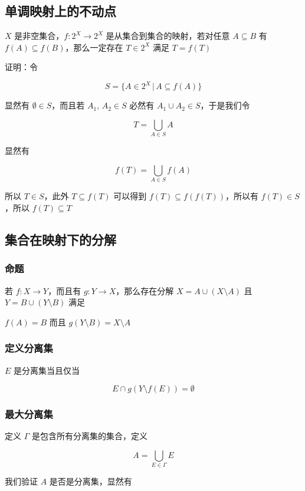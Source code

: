 \documentclass[12pt,a4paper]{ctexart}
\begin{document}
\subsection{单调映射上的不动点}

$X$ 是非空集合，$f: 2^X \to 2^X$ 是从集合到集合的映射，若对任意 $A \subseteq B$ 有 $f(A) \subseteq f(B)$，那么一定存在 $T \in 2^X$ 满足 $T = f(T)$

证明：令

\[
S = \{ A \in 2^X \,\vert\, A \subseteq f(A) \}
\]

显然有 $\emptyset \in S$，而且若 $A_1,\, A_2 \in S$ 必然有 $A_1 \cup A_2 \in S$，于是我们令

\[
T = \bigcup_{A \in S} A
\]

显然有

\[
f(T) = \bigcup_{A \in S}f(A)
\]

所以 $T \in S$，此外 $T \subseteq f(T)$ 可以得到 $f(T) \subseteq f(f(T))$，所以有 $f(T) \in S$，所以 $f(T) \subseteq T$

\subsection{集合在映射下的分解}

\subsubsection{命题}

若 $f: X \to Y$，而且有 $g: Y \to X$，那么存在分解 $X = A \cup (X \setminus A)$ 且 $Y = B \cup (Y \setminus B)$ 满足

$f(A) = B$ 而且 $g(Y \setminus B) = X \setminus A$ 

\subsubsection{定义分离集}

$E$ 是分离集当且仅当 

\[
E \cap g(Y \setminus f(E)) = \emptyset
\]

\subsubsection{最大分离集}

定义 $\Gamma$ 是包含所有分离集的集合，定义

\[
A = \bigcup_{E \in \Gamma} E
\]

我们验证 $A$ 是否是分离集，显然有
\end{document}
